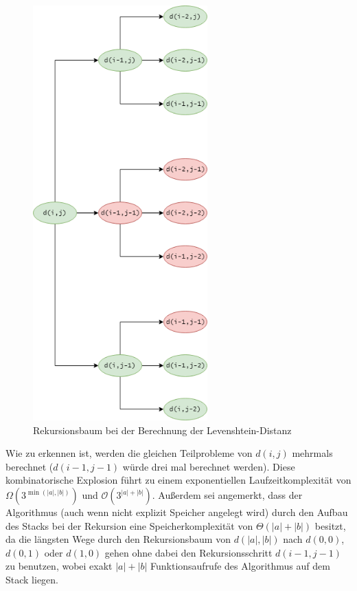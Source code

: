 \documentclass{whswinvcbook}
\begin{document}
\begin{figure}[H]
    \centering
    \includegraphics[width=0.6\textwidth]{img/levenshtein_recursion.png}
    \caption{Rekursionsbaum bei der Berechnung der Levenshtein-Distanz}
    \label{fig-levenshtein-recursion}
\end{figure}
Wie zu erkennen ist, werden die gleichen Teilprobleme von $d(i,j)$ mehrmals berechnet ($d(i-1,j-1)$ würde drei mal berechnet werden). Diese kombinatorische Explosion führt zu einem exponentiellen Laufzeitkomplexität von $\Omega(3^{\min(|a|,|b|)})$ und $\mathcal{O}(3^{|a|+|b|})$. Außerdem sei angemerkt, dass der Algorithmus (auch wenn nicht explizit Speicher angelegt wird) durch den Aufbau des Stacks bei der Rekursion eine Speicherkomplexität von $\Theta(|a|+|b|)$ besitzt, da die längsten Wege durch den Rekursionsbaum von $d(|a|,|b|)$ nach $d(0,0)$, $d(0,1)$ oder $d(1,0)$ gehen ohne dabei den Rekursionsschritt $d(i-1,j-1)$ zu benutzen, wobei exakt $|a|+|b|$ Funktionsaufrufe des Algorithmus auf dem Stack liegen.
\end{document}
